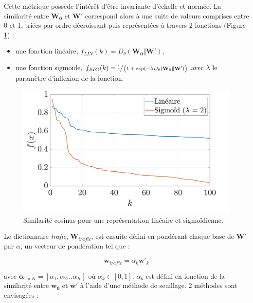 Cette métrique possède l'intérêt d'être invariante d'échelle et normée. La similarité entre $\mathbf{W_0}$ et $\mathbf{W'}$ correspond alors à une suite de valeurs comprises entre 0 et 1,  triées par ordre décroissant puis représentées à travers 2 fonctions (Figure \ref{fig:resume_simil}) : 

\begin{itemize}
\item une fonction linéaire, $f_{LIN}(k) = D_{\theta}(\mathbf{W_0} \Vert \mathbf{W'})$,  
\item une fonction sigmoïde, $f_{SIG}(k) = \sfrac{1}{\left(1+\exp({-\lambda D_{\theta}(\mathbf{W_0} \Vert \mathbf{W'})}\right)}$ avec $\lambda$ le paramètre d'inflexion de la fonction.
\end{itemize}

\begin{figure}
    \centering
    \includegraphics[width=0.7\linewidth]{./figures/NMF/lin_sig.pdf}
    \caption{Similarité cosinus pour une représentation linéaire et sigmoïdienne.}
    \label{fig:resume_simil}
\end{figure}

Le dictionnaire \textit{trafic}, $\mathbf{W}_{trafic}$, est ensuite défini en pondérant chaque base de $\mathbf{W'}$ par $\alpha$, un vecteur de pondération tel que : 

\begin{equation}
\mathbf{w}_{trafic} = \alpha_k \mathbf{w'}_k
\end{equation}

avec $\mathbf{\alpha}_{1 \times K} = \left[\alpha_1, \alpha_2 \dots \alpha_K \right]$ où $\alpha_k \in \left[0,1 \right]$. $\alpha_k$ est défini en fonction de la similarité entre $\mathbf{w_0}$ et $\mathbf{w'}$ à l'aide d'une méthode de seuillage. 2 méthodes sont envisagées : 

